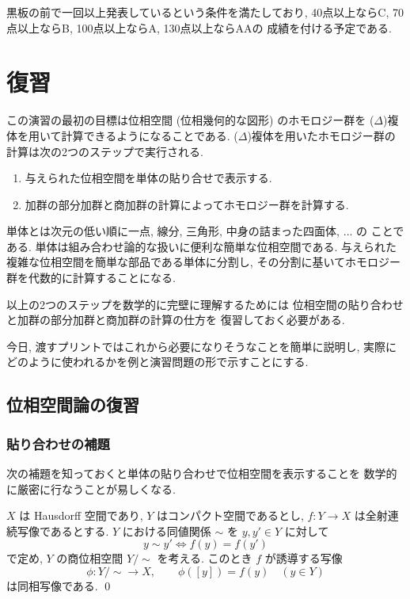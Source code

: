 \documentclass[12pt,twoside]{jarticle}
\begin{document}
黒板の前で一回以上発表しているという条件を満たしており, 
40点以上ならC, 70点以上ならB, 100点以上ならA, 130点以上ならAAの
成績を付ける予定である.


\section{復習}
\label{sec:hukushu}

この演習の最初の目標は位相空間 (位相幾何的な図形) のホモロジー群を
($\Delta$)複体を用いて計算できるようになることである.
($\Delta$)複体を用いたホモロジー群の計算は次の2つのステップで実行される.
\begin{enumerate}
\item 与えられた位相空間を単体の貼り合せで表示する. 
\item 加群の部分加群と商加群の計算によってホモロジー群を計算する.
\end{enumerate}
単体とは次元の低い順に一点, 線分, 三角形, 中身の詰まった四面体, $\ldots$ の
ことである. 単体は組み合わせ論的な扱いに便利な簡単な位相空間である.
与えられた複雑な位相空間を簡単な部品である単体に分割し,
その分割に基いてホモロジー群を代数的に計算することになる.

以上の2つのステップを数学的に完壁に理解するためには
位相空間の貼り合わせと加群の部分加群と商加群の計算の仕方を
復習しておく必要がある.

今日, 渡すプリントではこれから必要になりそうなことを簡単に説明し,
実際にどのように使われるかを例と演習問題の形で示すことにする.


\subsection{位相空間論の復習}
\label{sec:top}


\subsubsection{貼り合わせの補題}
\label{sec:hariawase}

次の補題を知っておくと単体の貼り合わせで位相空間を表示することを
数学的に厳密に行なうことが易しくなる.

\begin{lemma}[貼り合わせの補題]
  \label{lemma:hariawase}
  $X$ は Hausdorff 空間であり, %
  $Y$ はコンパクト空間であるとし, %
  $f: Y\to X$ は全射連続写像であるとする.
  $Y$ における同値関係 $\sim$ を $y,y'\in Y$ に対して
  \begin{equation*}
    y\sim y' \iff f(y) = f(y')
  \end{equation*}
  で定め, $Y$ の商位相空間 $Y/{\sim}$ を考える.
  このとき $f$ が誘導する写像
  \begin{equation*}
  \phi: Y/{\sim} \to X, \qquad 
  \phi([y])=f(y)\quad (y\in Y)   
  \end{equation*}
  は同相写像である.
  \qed
\end{lemma}
\end{document}

